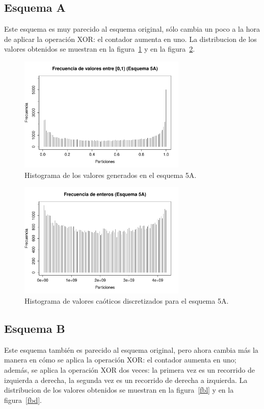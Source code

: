 \documentclass[preprint]{elsarticle}
\begin{document}
\subsection{Esquema A}
Este esquema es muy parecido al esquema original, sólo cambia un poco a la hora de aplicar la operación XOR: el contador aumenta en uno. La distribucion de los valores obtenidos se muestran en la figura~\ref{fal} y en la figura~\ref{fad}.



\begin{figure}[H]  
\centering
\includegraphics[width=8cm]{faa.pdf}
\caption{Histograma de los valores generados en el esquema 5A.}
\label{fal}
\end{figure}


\begin{figure}[H]
\centering
\includegraphics[width=8cm]{fab.pdf}
\caption{Histograma de valores caóticos discretizados para el esquema 5A.}
\label{fad}
\end{figure}




\subsection{Esquema B}
Este esquema también es parecido al esquema original, pero ahora cambia más la manera en cómo se aplica la operación XOR: el contador aumenta en uno; además, se aplica la operación XOR dos veces: la primera vez es un recorrido de izquierda a derecha, la segunda vez es un recorrido de derecha a izquierda. La distribucion de los valores obtenidos se muestran en la figura~\ref{fbl} y en la figura~\ref{fbd}.
\end{document}
